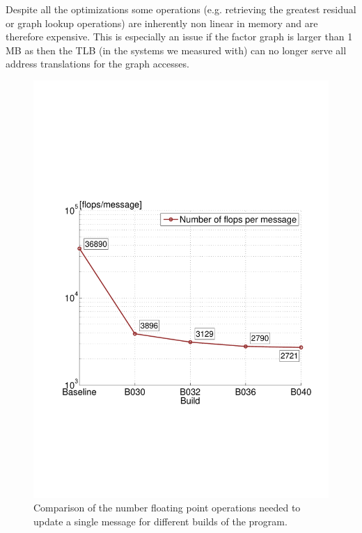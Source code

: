 Despite all the optimizations some operations (e.g. retrieving the greatest residual or graph lookup operations) are inherently non linear in memory and are therefore expensive. This is especially an issue if the factor graph is larger than 1 MB as then the TLB (in the systems we measured with) can no longer serve all address translations for the graph accesses.

\begin{figure}\centering
    \includegraphics[scale=0.4, trim={2cm 6.5cm 1cm 8.5cm},clip]{graphics/flops_per_message.pdf}
  \caption{Comparison of the number floating point operations needed to update a single message for different builds of the program.\label{flops-per-message}}
\end{figure}


